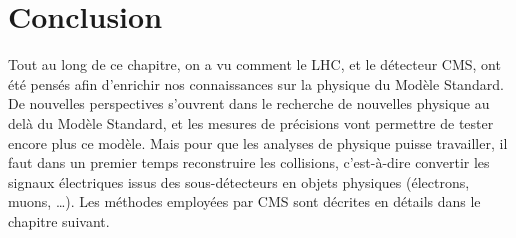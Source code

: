 \section{Conclusion}

Tout au long de ce chapitre, on a vu comment le LHC, et le détecteur CMS, ont été pensés afin d'enrichir nos connaissances sur la physique du Modèle Standard. De nouvelles perspectives s'ouvrent dans le recherche de nouvelles physique au delà du Modèle Standard, et les mesures de précisions vont permettre de tester encore plus ce modèle. Mais pour que les analyses de physique puisse travailler, il faut dans un premier temps reconstruire les collisions, c'est-à-dire convertir les signaux électriques issus des sous-détecteurs en objets physiques (électrons, muons, \dots). Les méthodes employées par CMS sont décrites en détails dans le chapitre suivant.